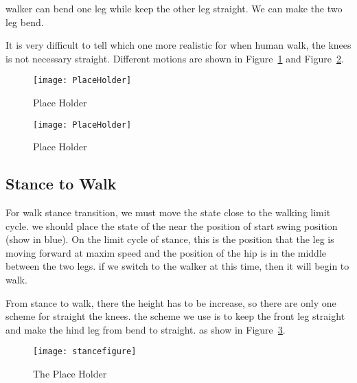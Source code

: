 \begin{itemize}
		walker can bend one leg while keep the other leg straight.
		We can make the two leg bend.
\end{itemize}

It is very difficult to tell which one more realistic for when human walk, the knees is not necessary straight.
Different motions are shown in Figure~\ref{fig:walkstancestraight} and Figure~\ref{fig:walkstancebend}.

\begin{figure}[!htbp]
  \begin{center}
      \texttt{[image: PlaceHolder]}
    \caption{Place Holder}
    \label{fig:walkstancestraight}
\end{center}
\end{figure}

\begin{figure}[!htbp]
  \begin{center}
      \texttt{[image: PlaceHolder]} 
    \caption{Place Holder}
    \label{fig:walkstancebend}
\end{center}
\end{figure}

\subsection{Stance to Walk}
For walk stance transition, we must move the state close to the walking limit cycle.
we should place the state of the near the position of start swing position (show in blue).
On the limit cycle of stance, this is the position that the leg is moving forward at maxim speed and the position of the hip is in the middle between the two legs.
if we switch to the walker at this time, then it will begin to walk.



From stance to walk, there the height has to be increase, so there are only one scheme for straight the knees.
the scheme we use is to keep the front leg straight and make the hind leg from bend to straight.
as show in Figure~\ref{fig:stance2walk}.
\begin{figure}[!htbp]
  \begin{center}
      \texttt{[image: stancefigure]}
    \caption{The Place Holder}
    \label{fig:stance2walk}
\end{center}
\end{figure}


